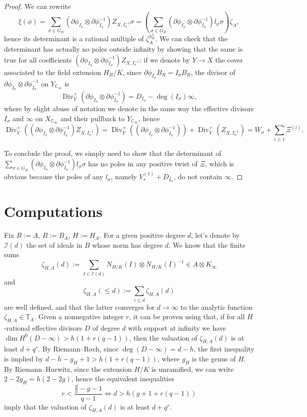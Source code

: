 \documentclass[11pt]{amsart}
\numberwithin{equation}{section}
\newcommand{\Div}{\operatorname{Div}}
\newcommand{\CC}{\mathbb{C}}
\newcommand{\TT}{\mathbb{T}}
\begin{document}
\begin{proof}
We can rewrite 
\[\xi(\phi)=\sum_{\sigma\in G_R}(\partial\phi_{I_\sigma}\otimes\partial\phi_{I_\sigma}^{-1})Z_{X,I_\sigma^{-1}}\sigma=\left(\sum_{\sigma\in G_R}(\partial\phi_{I_\sigma}\otimes\partial\phi_{I_\sigma}^{-1})l_\sigma\sigma\right)\zeta_A,\] 
hence its determinant is a rational multiple of $\zeta_A^{h_R^2}$. 
We can check that the determinant has actually no poles outside infinity by showing that the same is true for all coefficients $(\partial\phi_{I_\sigma}\otimes\partial\phi_{I_\sigma}^{-1})Z_{X,I_\sigma^{-1}}$:
if we denote by $Y\to X$ the cover associated to the field extension $H_R/K$, since $\partial\phi_{I_\sigma}B_R=I_\sigma B_R$, the divisor of $\partial\phi_{I_\sigma}\otimes\partial\phi_{I_\sigma}^{-1}$ on $Y_{\CC_\infty}$ is
\[\Div^+_Y(\partial\phi_{I_\sigma}\otimes\partial\phi_{I_\sigma}^{-1})=D_{I_\sigma}-\deg(I_\sigma)\infty,\]
where by slight abuse of notation we denote in the same way the effective divisors $I_\sigma$ and $\infty$ on $X_{\CC_\infty}$ and their pullback to $Y_{\CC_\infty}$, hence
\[\Div_Y^+\left((\partial\phi_{I_\sigma}\otimes\partial\phi_{I_\sigma}^{-1})Z_{X,I_\sigma^{-1}}\right)=\Div_Y^+\left((\partial\phi_{I_\sigma}\otimes\partial\phi_{I_\sigma}^{-1})\right)+\Div_Y^+\left(Z_{X,I_\sigma^{-1}}\right)=W_\sigma+\sum_{i\geq1}\Xi^{(i)}.\]

To conclude the proof, we simply need to show that the determinant of $\sum_{\sigma\in G_R}(\partial\phi_{I_\sigma}\otimes\partial\phi_{I_\sigma}^{-1})l_\sigma\sigma$ has no poles in any positive twist of $\Xi$, which is obvious because the poles of any $l_\sigma$, namely $V_*^{(1)}+D_{I_\sigma}$, do not contain $\infty$.
\end{proof}

\section{Computations}

Fix $R:= A$, $B:= B_A$, $H:= H_A$.
For a given positive degree $d$, let's denote by $\mathcal{I}(d)$ the set of ideals in $B$ whose norm has degree $d$. We know that the finite sums
\[\zeta_{H,A}(d):=\sum_{I \in\mathcal{I}(d)}N_{H/K}(I)\otimes N_{H/K}(I)^{-1}\in A\otimes K_\infty\]
and
\[\zeta_{H,A}(\le d):=\sum_{i \le d}\zeta_{H,A}(d)\]
are well defined, and that the latter converges for $d\to\infty$ to the analytic function $\zeta_{H,A}\in \TT_A$.
Given a nonnegative integer $r$, it can be proven using \cite[Lemma 8.8.1]{GOS} that, if for all $H$-rational effective divisors $D$ of degree $d$ with support at infinity we have $\dim H^0(D-\infty)>h(1+r(q-1))$, then the valuation of $\zeta_{H,A}(d)$ is at least $d+q^r$. By Riemann--Roch, since $\deg(D-\infty)=d-h$, the first inequality is implied by $d-h-g_H+1>h(1+r(q-1))$, where $g_H$ is the genus of $H$. By Riemann--Hurwitz, since the extension $H/K$ is unramified, we can write $2-2g_H=h(2-2g)$, hence the equivalent inequalities 
\[r<\frac{\frac{d}{h}-g-1}{q-1}\Leftrightarrow d>h(g+1+r(q-1))\]
imply that the valuation of $\zeta_{H,A}(d)$ is at least $d+q^r$.
\end{document}
